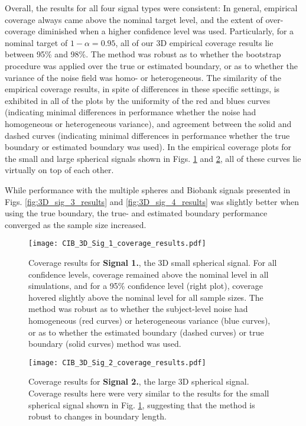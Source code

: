 Overall, the results for all four signal types were consistent: In general, empirical coverage always came above the nominal target level, and the extent of over-coverage diminished when a higher confidence level was used. Particularly, for a nominal target of $1 - \alpha = 0.95$, all of our 3D empirical coverage results lie between 95\% and 98\%. The method was robust as to whether the bootstrap procedure was applied over the true or estimated boundary, or as to whether the variance of the noise field was homo- or heterogeneous. The similarity of the empirical coverage results, in spite of differences in these specific settings, is exhibited in all of the plots by the uniformity of the red and blues curves (indicating minimal differences in performance whether the noise had homogeneous or heterogeneous variance), and agreement between the solid and dashed curves (indicating minimal differences in performance whether the true boundary or estimated boundary was used). In the empirical coverage plots for the small and large spherical signals shown in Figs. \ref{fig:3D_sig_1_results} and \ref{fig:3D_sig_2_results}, all of these curves lie virtually on top of each other. 

While performance with the multiple spheres and Biobank signals presented in Figs. \ref{fig:3D_sig_3_results} and \ref{fig:3D_sig_4_results} was slightly better when using the true boundary, the true- and estimated boundary performance converged as the sample size increased.

\begin{figure}[htbp]
\hspace*{-1.5cm}
    \texttt{[image: CIB\_3D\_Sig\_1\_coverage\_results.pdf]}
\caption{Coverage results for \textbf{Signal 1.}, the 3D small spherical signal. For all confidence levels, coverage remained above the nominal level in all simulations, and for a 95\% confidence level (right plot), coverage hovered slightly above the nominal level for all sample sizes. The method was robust as to whether the subject-level noise had homogeneous (red curves) or heterogeneous variance (blue curves), or as to whether the estimated boundary (dashed curves) or true boundary (solid curves) method was used.}
\label{fig:3D_sig_1_results}
\end{figure}

\begin{figure}[htbp]
\hspace*{-1.5cm}
    \texttt{[image: CIB\_3D\_Sig\_2\_coverage\_results.pdf]}
\caption{Coverage results for \textbf{Signal 2.}, the large 3D spherical signal. Coverage results here were very similar to the results for the small spherical signal shown in Fig. \ref{fig:3D_sig_1_results}, suggesting that the method is robust to changes in boundary length.}
\label{fig:3D_sig_2_results}
\end{figure}

